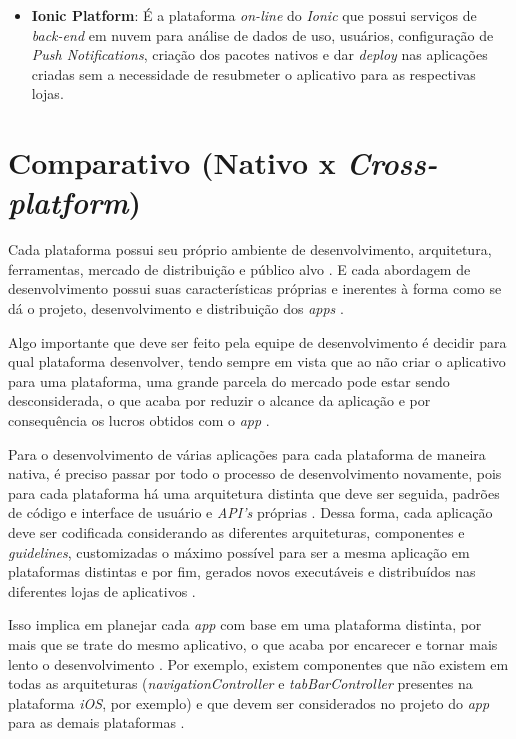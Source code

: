 \begin{itemize}
    \item \textbf{Ionic Platform}: É a plataforma \textit{on-line} do \textit{Ionic} que possui serviços de \textit{back-end} em nuvem para análise de dados de uso,
     usuários, configuração de \textit{Push Notifications}, criação dos pacotes nativos e dar \textit{deploy} nas aplicações criadas sem a necessidade de
     resubmeter o aplicativo para as respectivas lojas. 
     
\end{itemize}

\chapter{Comparativo (Nativo x \textit{Cross-platform})} \label{cap:comparativo}

Cada plataforma possui seu próprio ambiente de desenvolvimento, arquitetura, ferramentas, mercado de distribuição e público alvo \cite{shakshuki_4th_2013}.
E cada abordagem de desenvolvimento possui suas características próprias e inerentes à forma como se dá o projeto, desenvolvimento e distribuição dos \textit{apps} \cite{corral_ant_2012}.

Algo importante que deve ser feito pela equipe de desenvolvimento é decidir para qual plataforma desenvolver, tendo sempre em vista que 
ao não criar o aplicativo para uma plataforma, uma grande parcela do mercado pode estar sendo desconsiderada, o que acaba por reduzir o alcance
da aplicação e por consequência os lucros obtidos com o \textit{app} \cite{corral_ant_2012}. 

Para o desenvolvimento de várias aplicações para cada plataforma de maneira nativa, é preciso passar por todo o processo de desenvolvimento novamente, 
pois para cada plataforma há uma arquitetura distinta que deve ser seguida, padrões de código e interface de usuário e \textit{API's} próprias \cite{holzinger_making_2012}.
Dessa forma, cada aplicação deve ser codificada considerando as diferentes arquiteturas, componentes e \textit{guidelines}, customizadas o máximo possível 
para ser a mesma aplicação em plataformas distintas e por fim, gerados novos executáveis e distribuídos nas diferentes lojas de aplicativos \cite{corral_ant_2012}.

Isso implica em planejar cada \textit{app} com base em uma plataforma distinta, por mais que se trate do mesmo aplicativo, o que acaba por encarecer 
e tornar mais lento o desenvolvimento \cite{kassas_taxonomy_2015}. Por exemplo, existem componentes que não existem em todas as arquiteturas (\textit{navigationController} e 
\textit{tabBarController} presentes na plataforma \textit{iOS}, por exemplo) e que devem ser considerados no projeto do \textit{app} para as demais plataformas \cite{shakshuki_4th_2013}.

